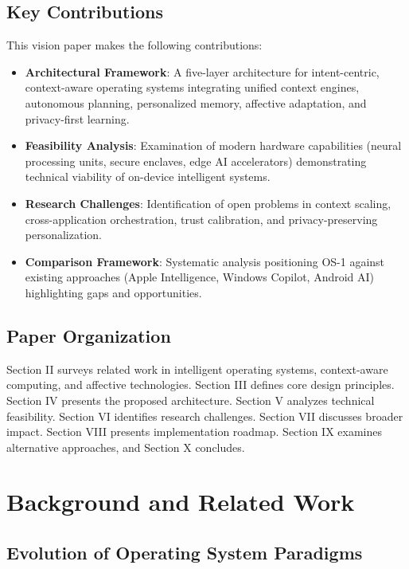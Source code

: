 \documentclass[conference]{IEEEtran}
\begin{document}
\subsection{Key Contributions}

This vision paper makes the following contributions:

\begin{itemize}
\item \textbf{Architectural Framework}: A five-layer architecture for intent-centric, context-aware operating systems integrating unified context engines, autonomous planning, personalized memory, affective adaptation, and privacy-first learning.

\item \textbf{Feasibility Analysis}: Examination of modern hardware capabilities (neural processing units, secure enclaves, edge AI accelerators) demonstrating technical viability of on-device intelligent systems.

\item \textbf{Research Challenges}: Identification of open problems in context scaling, cross-application orchestration, trust calibration, and privacy-preserving personalization.

\item \textbf{Comparison Framework}: Systematic analysis positioning OS-1 against existing approaches (Apple Intelligence, Windows Copilot, Android AI) highlighting gaps and opportunities.
\end{itemize}

\subsection{Paper Organization}

Section II surveys related work in intelligent operating systems, context-aware computing, and affective technologies. Section III defines core design principles. Section IV presents the proposed architecture. Section V analyzes technical feasibility. Section VI identifies research challenges. Section VII discusses broader impact. Section VIII presents implementation roadmap. Section IX examines alternative approaches, and Section X concludes.

\section{Background and Related Work}

\subsection{Evolution of Operating System Paradigms}
\end{document}
